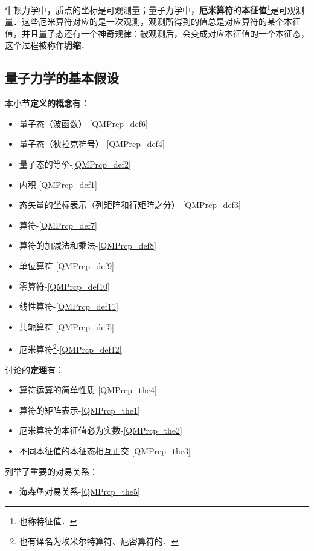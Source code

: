 牛顿力学中，质点的坐标是可观测量；量子力学中，\textbf{厄米算符}的\textbf{本征值}\footnote{也称特征值．}是可观测量．这些厄米算符对应的是一次观测，观测所得到的值总是对应算符的某个本征值，并且量子态还有一个神奇规律：被观测后，会变成对应本征值的一个本征态，这个过程被称作\textbf{坍缩}．



\subsection{量子力学的基本假设}

本小节\textbf{定义的概念}有：

\begin{itemize}
\item 量子态（波函数）-\autoref{QMPrcp_def6} 
\item 量子态（狄拉克符号）-\autoref{QMPrcp_def4} 
\item 量子态的等价-\autoref{QMPrcp_def2} 
\item 内积-\autoref{QMPrcp_def1} 
\item 态矢量的坐标表示（列矩阵和行矩阵之分）-\autoref{QMPrcp_def3} 
\item 算符-\autoref{QMPrcp_def7} 
\item 算符的加减法和乘法-\autoref{QMPrcp_def8} 
\item 单位算符-\autoref{QMPrcp_def9} 
\item 零算符-\autoref{QMPrcp_def10} 
\item 线性算符-\autoref{QMPrcp_def11} 
\item 共轭算符-\autoref{QMPrcp_def5} 
\item 厄米算符\footnote{也有译名为埃米尔特算符、厄密算符的．}-\autoref{QMPrcp_def12} 
\end{itemize}


讨论的\textbf{定理}有：

\begin{itemize}
\item 算符运算的简单性质-\autoref{QMPrcp_the4} 
\item 算符的矩阵表示-\autoref{QMPrcp_the1} 
\item 厄米算符的本征值必为实数-\autoref{QMPrcp_the2} 
\item 不同本征值的本征态相互正交-\autoref{QMPrcp_the3} 
\end{itemize}

列举了重要的对易关系：

\begin{itemize}
\item 海森堡对易关系-\autoref{QMPrcp_the5} 
\end{itemize}



